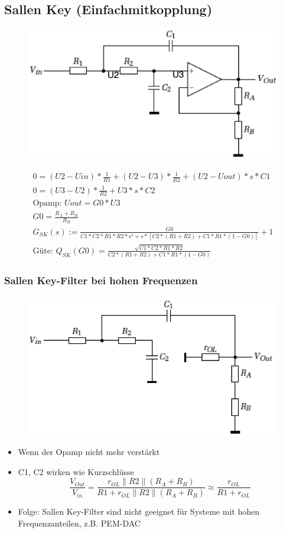 \subsection{Sallen Key (Einfachmitkopplung)}
\begin{figure}[htb]
\centering
 \includegraphics[scale=0.5]{pictures/sallenkey}
\end{figure}
\begin{gather}
0=(U2-Uin)*\frac{1}{R1}+(U2-U3)*\frac{1}{R2}+(U2-Uout)*s*C1\\
0=(U3-U2)*\frac{1}{R2}+U3*s*C2\\
\text{Opamp: }Uout=G0*U3\\
G0=\frac{R_{A}+R_{B}}{R_{B}}\\
G_{SK}(s):=\frac{G0}{C1*C2*R1*R2*s^s+s*[C2*(R1+R2)+C1*R1*(1-G0)]}+1\\
\text{Güte: }Q_{SK}(G0)=\frac{\sqrt{C1*C2*R1*R2}}{C2*(R1+R2)+C1*R1*(1-G0)}
\end{gather}
\subsubsection{Sallen Key-Filter bei hohen Frequenzen}
\begin{figure}[htb]
\centering
 \includegraphics[scale=0.5]{pictures/sallenkey2}
\end{figure}
\begin{itemize}
  \item Wenn der Opamp nicht mehr verstärkt
  \item C1, C2 wirken wie Kurzschlüsse
  \begin{equation}
  \frac{V_{Out}}{V_{in}}=\frac{r_{OL}\parallel R2\parallel
  (R_{A}+R_{B})}{R1+r_{OL}\parallel R2\parallel (R_{A}+R_{B})}\approx
  \frac{r_{OL}}{R1+r_{OL}}
  \end{equation}
  \item Folge: Sallen Key-Filter sind nicht geeignet für Systeme mit hohen
  Frequenzanteilen, z.B. PEM-DAC
\end{itemize}
\newpage
